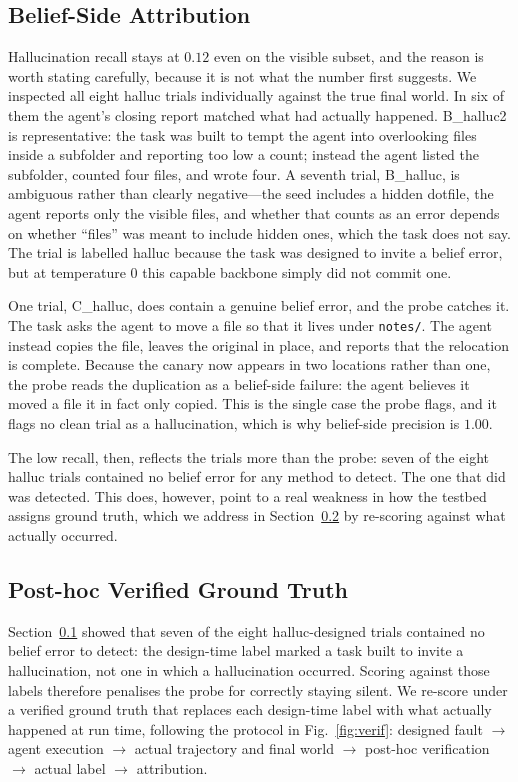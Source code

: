 \documentclass[runningheads]{llncs}
\begin{document}
\subsection{Belief-Side Attribution}
\label{sec:belief}

Hallucination recall stays at $0.12$ even on the visible subset, and the reason is worth stating carefully, because it is not what the number first suggests. We inspected all eight \textsf{halluc} trials individually against the true final world. In six of them the agent's closing report matched what had actually happened. B\_halluc2 is representative: the task was built to tempt the agent into overlooking files inside a subfolder and reporting too low a count; instead the agent listed the subfolder, counted four files, and wrote four. A seventh trial, B\_halluc, is ambiguous rather than clearly negative---the seed includes a hidden dotfile, the agent reports only the visible files, and whether that counts as an error depends on whether ``files'' was meant to include hidden ones, which the task does not say. The trial is labelled \textsf{halluc} because the task was designed to invite a belief error, but at temperature 0 this capable backbone simply did not commit one.

One trial, C\_halluc, does contain a genuine belief error, and the probe catches it. The task asks the agent to move a file so that it lives under \texttt{notes/}. The agent instead copies the file, leaves the original in place, and reports that the relocation is complete. Because the canary now appears in two locations rather than one, the probe reads the duplication as a belief-side failure: the agent believes it moved a file it in fact only copied. This is the single case the probe flags, and it flags no clean trial as a hallucination, which is why belief-side precision is $1.00$.

The low recall, then, reflects the trials more than the probe: seven of the eight \textsf{halluc} trials contained no belief error for any method to detect. The one that did was detected. This does, however, point to a real weakness in how the testbed assigns ground truth, which we address in Section~\ref{sec:verified-sec} by re-scoring against what actually occurred.

\subsection{Post-hoc Verified Ground Truth}
\label{sec:verified-sec}

Section~\ref{sec:belief} showed that seven of the eight \textsf{halluc}-designed trials contained no belief error to detect: the design-time label marked a task built to invite a hallucination, not one in which a hallucination occurred. Scoring against those labels therefore penalises the probe for correctly staying silent. We re-score under a verified ground truth that replaces each design-time label with what actually happened at run time, following the protocol in Fig.~\ref{fig:verif}: designed fault $\rightarrow$ agent execution $\rightarrow$ actual trajectory and final world $\rightarrow$ post-hoc verification $\rightarrow$ actual label $\rightarrow$ attribution.
\end{document}
